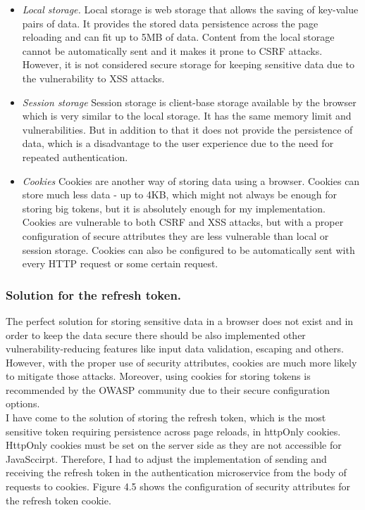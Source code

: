 \begin{itemize}
    \item \emph{Local storage.} Local storage is web storage that allows the saving of key-value pairs of data. It provides the stored data persistence across the page reloading and can fit up to 5MB of data. Content from the local storage cannot be automatically sent and it makes it prone to CSRF attacks. However, it is not considered secure storage for keeping sensitive data due to the vulnerability to XSS attacks.
    \item \emph{Session storage} Session storage is client-base storage available by the browser which is very similar to the local storage. It has the same memory limit and vulnerabilities. But in addition to that it does not provide the persistence of data, which is a disadvantage to the user experience due to the need for repeated authentication.
    \item \emph{Cookies} Cookies are another way of storing data using a browser. Cookies can store much less data - up to 4KB, which might not always be enough for storing big tokens, but it is absolutely enough for my implementation. Cookies are vulnerable to both CSRF and XSS attacks, but with a proper configuration of secure attributes they are less vulnerable than local or session storage. Cookies can also be configured to be automatically sent with every HTTP request or some certain request.
\end{itemize}

\subsubsection*{Solution for the refresh token.} The perfect solution for storing sensitive data in a browser does not exist and in order to keep the data secure there should be also implemented other vulnerability-reducing features like input data validation, escaping and others. However, with the proper use of security attributes, cookies are much more likely to mitigate those attacks. Moreover, using cookies for storing tokens is recommended by the OWASP community due to their secure configuration options. \\
I have come to the solution of storing the refresh token, which is the most sensitive token requiring persistence across page reloads, in httpOnly cookies. HttpOnly cookies must be set on the server side as they are not accessible for JavaSccirpt. Therefore, I had to adjust the implementation of sending and receiving the refresh token in the authentication microservice from the body of requests to cookies. Figure 4.5 shows the configuration of security attributes for the refresh token cookie.\\

